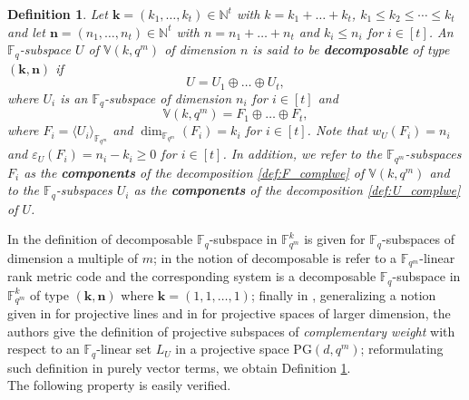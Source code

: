 \documentclass[11pt]{amsart}
\newtheorem{definition}[theorem]{Definition}
\newcommand{\fqm}{\mathbb{F}_{q^m}}
\newcommand{\fq}{{\mathbb F}_{q}}
\begin{document}
\begin{definition} \label{def:decomp}
   Let $\mathbf{k}=(k_1,\ldots,k_t)\in\mathbb N^t$ with $k=k_1+\ldots+k_t$, $k_1\leq k_2\leq \cdots \leq k_t$ and let $\mathbf{n}=(n_1,\ldots,n_t)\in\mathbb N^t$ with $n=n_1+\ldots+n_t$ and $k_i\leq n_i$ for $i\in [t]$. An $\fq$-subspace $U$ of $\mathbb{V}(k,q^m)$ of dimension $n$ is said to be {\bf decomposable} of type $(\mathbf{k}, \mathbf{n})$ if
 \begin{equation} \label{def:U_complwe}
 U=U_1\oplus \ldots \oplus U_t,
 \end{equation}
 where $U_i$ is an $\fq$-subspace of dimension $n_i$ for $i\in [t]$ and
  \begin{equation} \label{def:F_complwe}
      \mathbb{V}(k,q^m)=F_1\oplus \ldots \oplus F_t ,
  \end{equation}
  where $F_i=\langle U_i\rangle_{\fqm}$ and  $\dim_{\fqm} (F_i)=k_i $ for  $i\in [t]$. Note that $w_U(F_i)=n_i$ and $\varepsilon_U(F_i)=n_i-k_i\geq 0$ for $i\in [t]$. In addition, we refer to the $\fqm$-subspaces $F_i$ as the {\bf components} of the decomposition \eqref{def:F_complwe} of $\mathbb{V}(k,q^m)$ and to  the $\fq$-subspaces $U_i$ as the {\bf components} of the decomposition \eqref{def:U_complwe} of $U$.
\end{definition}



In \cite[Definition 2.3]{bartoli2024Exceptional_sequences} the definition of decomposable $\fq$-subspace in $\fqm^k$  is given for $\fq$-subspaces of dimension a multiple of $m$; in  \cite[Definition 3.3 and Remark 3.5]{santonastaso2024completely} the notion of decomposable is refer to a $\fqm$-linear rank metric code and the corresponding system is a decomposable $\fq$-subspace in $\fqm^k$ of type $(\mathbf{k}, \mathbf{n})$ where $\mathbf{k}=(1,1,\dots,1)$; finally  in \cite[Definition 12]{adriaensen2023minimum}, generalizing a notion given in \cite{napolitano2022linear} for projective lines and in \cite{zullo2023multi} for projective spaces of larger dimension, the authors give the definition of projective subspaces of {\it complementary weight} with respect to an $\fq$-linear set $L_U$ in a projective space $\mathrm{PG}(d,q^m)$;  reformulating such definition in purely vector terms, we obtain Definition \ref{def:decomp}.\\


The following property is easily verified.
\end{document}
